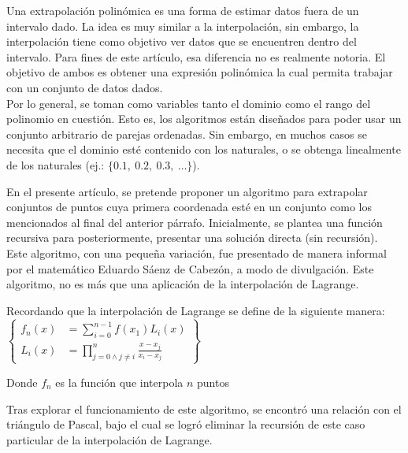 
Una extrapolación polinómica es una forma de estimar datos fuera de un
intervalo dado. La idea es muy similar a la interpolación, sin embargo,
la interpolación tiene como objetivo ver datos que se encuentren dentro
del intervalo. Para fines de este artículo, esa diferencia no es realmente
notoria. El objetivo de ambos es obtener una expresión polinómica la cual
permita trabajar con un conjunto de datos dados.\\
Por lo general, se toman como variables tanto el dominio como el rango del
polinomio en cuestión. Esto es, los algoritmos están diseñados para poder
usar un conjunto arbitrario de parejas ordenadas.
Sin embargo, en muchos casos se necesita que el dominio esté contenido con
los naturales, o se obtenga linealmente de los naturales
(ej.: $\{0.1,\ 0.2,\ 0.3,\ \dots\}$). 

En el presente artículo, se pretende proponer un algoritmo para extrapolar
conjuntos de puntos cuya primera coordenada esté en un conjunto como los
mencionados al final del anterior párrafo. Inicialmente, se plantea una
función recursiva para posteriormente, presentar una solución directa (sin recursión).\\
Este algoritmo, con una pequeña variación, fue presentado de manera informal
por el matemático Eduardo Sáenz de Cabezón, a modo de divulgación.
Este algoritmo, no es más que una aplicación de la interpolación de Lagrange.\\

\begin{center}
    Recordando que la interpolación de Lagrange se define de la siguiente manera:\\[20pt]
$
\left\{
\begin{aligned}
    f_n(x) &= \sum_{i=0}^{n-1}f(x_1)L_i(x)\\
    L_i(x) &= \prod_{j = 0 \land j \not= i}^{n} \frac{x - x_j}{x_i - x_j}
\end{aligned}
\right\}
$

    Donde $f_n$ es la función que interpola $n$ puntos
\end{center}

Tras explorar el funcionamiento de este algoritmo, se encontró una relación
con el triángulo de Pascal, bajo el cual se logró eliminar la recursión de
este caso particular de la interpolación de Lagrange. 